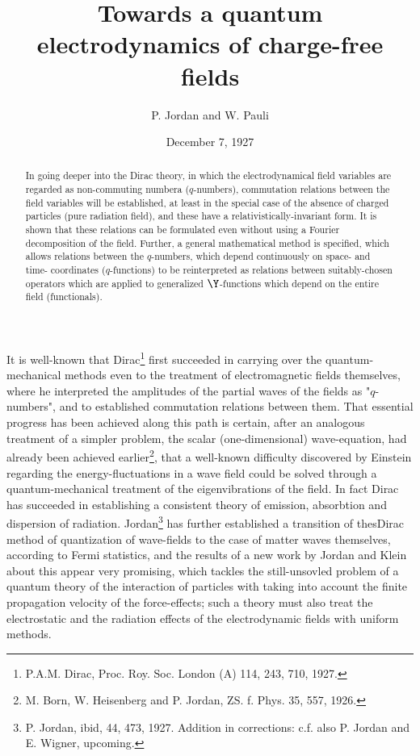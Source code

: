 \documentclass{article}
\title{Towards a quantum electrodynamics of charge-free fields}
\author{P. Jordan and W. Pauli}
\date{December 7, 1927}
\begin{document}
\maketitle

\begin{abstract}
In going deeper into the Dirac theory, in which the electrodynamical field variables are regarded as non-commuting numbera ($q$-numbers), commutation relations between the field variables will be established, at least in the special case of the absence of charged particles (pure radiation field), and these have a relativistically-invariant form. It is shown that these relations can be formulated even without using a Fourier decomposition of the field. Further, a general mathematical method is specified, which allows relations between the $q$-numbers, which depend continuously on space- and time- coordinates ($q$-functions) to be reinterpreted as relations between suitably-chosen operators which are applied to generalized $\Y$-functions which depend on the entire field (functionals).
\end{abstract}

It is well-known that Dirac\footnote{P.A.M. Dirac, Proc. Roy. Soc. London (A) 114, 243, 710, 1927.} first succeeded in carrying over the quantum-mechanical methods even to the treatment of electromagnetic fields themselves, where he interpreted the amplitudes of the partial waves of the fields as "$q$-numbers", and to established commutation relations between them. That essential progress has been achieved along this path is certain, after an analogous treatment of a simpler problem, the scalar (one-dimensional) wave-equation, had already been achieved earlier\footnote{M. Born, W. Heisenberg and P. Jordan, ZS. f. Phys. 35, 557, 1926.}, that a well-known difficulty discovered by Einstein regarding the energy-fluctuations in a wave field could be solved through a quantum-mechanical treatment of the eigenvibrations of the field. In fact Dirac has succeeded in establishing a consistent theory of emission, absorbtion and dispersion of radiation. Jordan\footnote{P. Jordan, ibid, 44, 473, 1927. Addition in corrections: c.f. also P. Jordan and E. Wigner, upcoming.} has further established a transition of thesDirac method of quantization of wave-fields to the case of matter waves themselves, according to Fermi statistics, and the results of a new work by Jordan and Klein about this appear very promising, which tackles the still-unsovled problem of a quantum theory of the interaction of particles with taking into account the finite propagation velocity of the force-effects; such a theory must also treat the electrostatic and the radiation effects of the electrodynamic fields with uniform methods.
\end{document}
